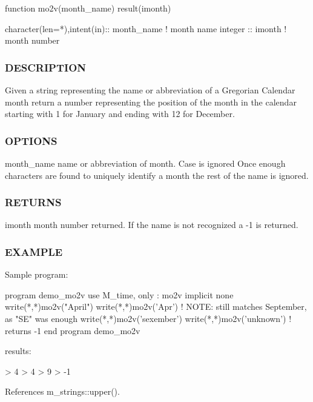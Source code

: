 \begin{DoxyVerb}
\begin{DoxyVerb}function mo2v(month_name) result(imonth)

  character(len=*),intent(in):: month_name ! month name
  integer                    :: imonth     ! month number
\end{DoxyVerb}


\subsubsection*{D\+E\+S\+C\+R\+I\+P\+T\+I\+ON}

Given a string representing the name or abbreviation of a Gregorian Calendar month return a number representing the position of the month in the calendar starting with 1 for January and ending with 12 for December.

\subsubsection*{O\+P\+T\+I\+O\+NS}

month\+\_\+name name or abbreviation of month. Case is ignored Once enough characters are found to uniquely identify a month the rest of the name is ignored. \subsubsection*{R\+E\+T\+U\+R\+NS}

imonth month number returned. If the name is not recognized a -\/1 is returned.

\subsubsection*{E\+X\+A\+M\+P\+LE}

\begin{DoxyVerb}Sample program:

 program demo_mo2v
 use M_time, only : mo2v
 implicit none
    write(*,*)mo2v("April")
    write(*,*)mo2v('Apr')
    ! NOTE: still matches September, as "SE" was enough
    write(*,*)mo2v('sexember')
    write(*,*)mo2v('unknown')  ! returns -1
 end program demo_mo2v

results:

   >  4
   >  4
   >  9
   > -1 \end{DoxyVerb}
 

References m\+\_\+strings\+::upper().


\end{DoxyVerb}
